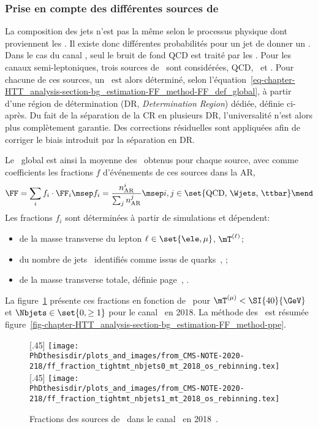 \subsubsection{Prise en compte des différentes sources de \ftauhs}
La composition des jets n'est pas la même selon le processus physique dont proviennent les \ftauhs.
Il existe donc différentes probabilités pour un jet de donner un \ftauh.
Dans le cas du canal \tauh\tauh, seul le bruit de fond QCD est traité par les \fakefactors.
Pour les canaux semi-leptoniques, trois sources de \ftauhs\ sont considérées, QCD, \Wjets\ et \ttbar.
Pour chacune de ces sources, un \fakefactor\ est alors déterminé, selon l'équation~\eqref{eq-chapter-HTT_analysis-section-bg_estimation-FF_method-FF_def_global}, à partir d'une région de détermination (DR, \emph{Determination Region}) dédiée, définie ci-après.
Du fait de la séparation de la CR en plusieurs DR, l'universalité n'est alors plus complètement garantie.
Des corrections résiduelles sont appliquées afin de corriger le biais introduit par la séparation en DR.
\par
Le \fakefactor\ global est ainsi la moyenne des \fakefactors\ obtenus pour chaque source, avec comme coefficients les fractions $f$ d'événements de ces sources dans la AR, \ie
\begin{equation}
\FF = \sum_i f_i \cdot \FF_i
\msep
f_i = \frac{n_\text{AR}^i}{\sum_j n_\text{AR}^{j}}
\msep
i,j \in \set{\text{QCD, \Wjets, \ttbar}}
\mend
\end{equation}
Les fractions $f_i$ sont déterminées à partir de simulations et dépendent:
\begin{itemize}
\item de la masse transverse du lepton $\ell\in\set{\ele,\mu}$, $\mT^{(\ell)}$;
\item du nombre de jets \Nprebjets\ identifiés comme issus de quarks~\quarkb, \Nbjets;
\item de la masse transverse totale, définie page~\pageref{eq-def_mTtot}, \mTtot.
\end{itemize}
La figure~\ref{fig-chapter-HTT_analysis-section-bg_estimation-FF_method-fractions} présente ces fractions en fonction de \mTtot\ pour $\mT^{(\mu)} < \SI{40}{\GeV}$ et $\Nbjets\in\set{0,\geq1}$ pour le canal \mu\tauh\ en 2018.
La méthode des \fakefactors\ est résumée figure~\ref{fig-chapter-HTT_analysis-section-bg_estimation-FF_method-ppe}.
\begin{figure}[h]
\centering

[.45\textwidth]
{\texttt{[image: \\PhDthesisdir/plots\_and\_images/from\_CMS-NOTE-2020-218/ff\_fraction\_tightmt\_nbjets0\_mt\_2018\_os\_rebinning.tex]}}
\hfill
{}[.45\textwidth]
{\texttt{[image: \\PhDthesisdir/plots\_and\_images/from\_CMS-NOTE-2020-218/ff\_fraction\_tightmt\_nbjets1\_mt\_2018\_os\_rebinning.tex]}}

\caption[Fractions des sources de \ftauhs\ dans le canal \mu\tauh\ en 2018.]{Fractions des sources de \ftauhs\ dans le canal \mu\tauh\ en 2018~\cite{CMS-NOTE-2020-218}.}
\label{fig-chapter-HTT_analysis-section-bg_estimation-FF_method-fractions}
\end{figure}
